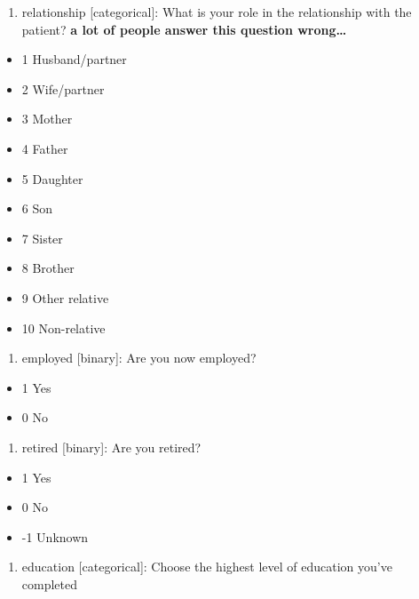 \documentclass[
  letterpaper,
  DIV=11,
  numbers=noendperiod]{scrreprt}
\providecommand{\tightlist}{%
  \setlength{\itemsep}{0pt}\setlength{\parskip}{0pt}}\usepackage{longtable,booktabs,array}
\begin{document}
\begin{enumerate}
\def\labelenumi{\arabic{enumi}.}
\setcounter{enumi}{11}
\tightlist
\item
  relationship {[}categorical{]}: What is your role in the relationship
  with the patient? \textbf{a lot of people answer this question
  wrong\ldots{}}
\end{enumerate}

\begin{itemize}
\tightlist
\item
  1 Husband/partner
\item
  2 Wife/partner
\item
  3 Mother
\item
  4 Father
\item
  5 Daughter
\item
  6 Son
\item
  7 Sister
\item
  8 Brother
\item
  9 Other relative
\item
  10 Non-relative
\end{itemize}

\begin{enumerate}
\def\labelenumi{\arabic{enumi}.}
\setcounter{enumi}{12}
\tightlist
\item
  employed {[}binary{]}: Are you now employed?
\end{enumerate}

\begin{itemize}
\tightlist
\item
  1 Yes
\item
  0 No
\end{itemize}

\begin{enumerate}
\def\labelenumi{\arabic{enumi}.}
\setcounter{enumi}{13}
\tightlist
\item
  retired {[}binary{]}: Are you retired?
\end{enumerate}

\begin{itemize}
\tightlist
\item
  1 Yes
\item
  0 No
\item
  -1 Unknown
\end{itemize}

\begin{enumerate}
\def\labelenumi{\arabic{enumi}.}
\setcounter{enumi}{14}
\tightlist
\item
  education {[}categorical{]}: Choose the highest level of education
  you've completed
\end{enumerate}
\end{document}
